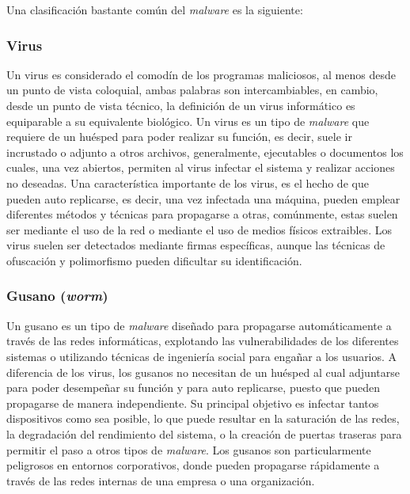 Una clasificación bastante común del \textit{malware} es la siguiente:

\subsubsection{Virus}
Un virus es considerado el comodín de los programas maliciosos, al menos desde un punto de vista coloquial, ambas palabras son intercambiables, en cambio, desde un punto de vista técnico, la definición de un virus informático es equiparable a su equivalente biológico. Un virus es un tipo de \textit{malware} que requiere de un huésped para poder realizar su función, es decir, suele ir incrustado o adjunto a otros archivos, generalmente, ejecutables o documentos los cuales, una vez abiertos, permiten al virus infectar el sistema y realizar acciones no deseadas. Una característica importante de los virus, es el hecho de que pueden auto replicarse, es decir, una vez infectada una máquina, pueden emplear diferentes métodos y técnicas para propagarse a otras, comúnmente, estas suelen ser mediante el uso de la red o mediante el uso de medios físicos extraibles. Los virus suelen ser detectados mediante firmas específicas, aunque las técnicas de ofuscación y polimorfismo pueden dificultar su identificación.

\subsubsection{Gusano (\textit{worm})}
Un gusano es un tipo de \textit{malware} diseñado para propagarse automáticamente a través de las redes informáticas, explotando las vulnerabilidades de los diferentes sistemas o utilizando técnicas de ingeniería social para engañar a los usuarios. A diferencia de los virus, los gusanos no necesitan de un huésped al cual adjuntarse para poder desempeñar su función y para auto replicarse, puesto que pueden propagarse de manera independiente. Su principal objetivo es infectar tantos dispositivos como sea posible, lo que puede resultar en la saturación de las redes, la degradación del rendimiento del sistema, o la creación de puertas traseras para permitir el paso a otros tipos de \textit{malware}. Los gusanos son particularmente peligrosos en entornos corporativos, donde pueden propagarse rápidamente a través de las redes internas de una empresa o una organización.

